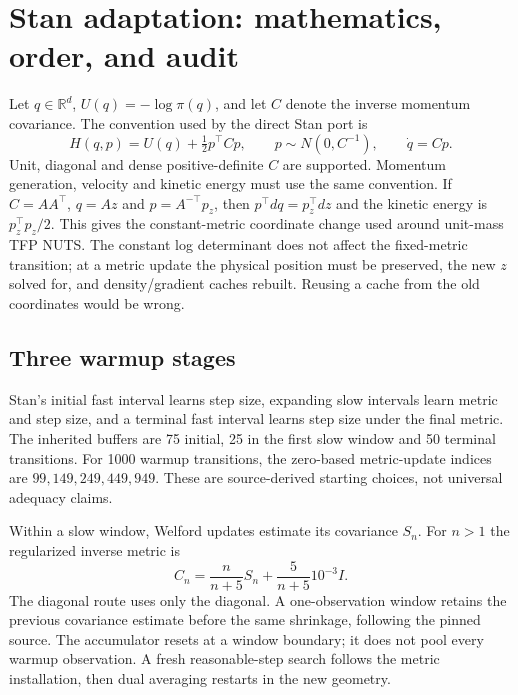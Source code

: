 \section{Stan adaptation: mathematics, order, and audit}
\label{sec:sw-stan-tuning}

Let $q\in\mathbb R^d$, $U(q)=-\log\pi(q)$, and let $C$ denote the
inverse momentum covariance. The convention used by the direct Stan port is
\begin{equation}
 H(q,p)=U(q)+\tfrac12p^\top Cp,\qquad
 p\sim N(0,C^{-1}),\qquad \dot q=Cp.
 \label{eq:sw-hamiltonian}
\end{equation}
Unit, diagonal and dense positive-definite $C$ are supported. Momentum
generation, velocity and kinetic energy must use the same convention.
If $C=AA^\top$, $q=Az$ and $p=A^{-\top}p_z$, then
$p^\top dq=p_z^\top dz$ and the kinetic energy is $p_z^\top p_z/2$.
This gives the constant-metric coordinate change used around unit-mass
TFP NUTS. The constant log determinant does not affect the fixed-metric
transition; at a metric update the physical position must be preserved,
the new $z$ solved for, and density/gradient caches rebuilt. Reusing a cache
from the old coordinates would be wrong.

\subsection{Three warmup stages}

Stan's initial fast interval learns step size, expanding slow intervals
learn metric and step size, and a terminal fast interval learns step size
under the final metric. The inherited buffers are 75 initial, 25 in the
first slow window and 50 terminal transitions. For 1000 warmup transitions,
the zero-based metric-update indices are $99,149,249,449,949$. These are
source-derived starting choices, not universal adequacy claims.

Within a slow window, Welford updates estimate its covariance $S_n$. For
$n>1$ the regularized inverse metric is
\begin{equation}
 C_n=\frac{n}{n+5}S_n+\frac{5}{n+5}10^{-3}I.
 \label{eq:sw-metric-shrinkage}
\end{equation}
The diagonal route uses only the diagonal. A one-observation window retains
the previous covariance estimate before the same shrinkage, following the
pinned source. The accumulator resets at a window boundary; it does not
pool every warmup observation. A fresh reasonable-step search follows the
metric installation, then dual averaging restarts in the new geometry.

